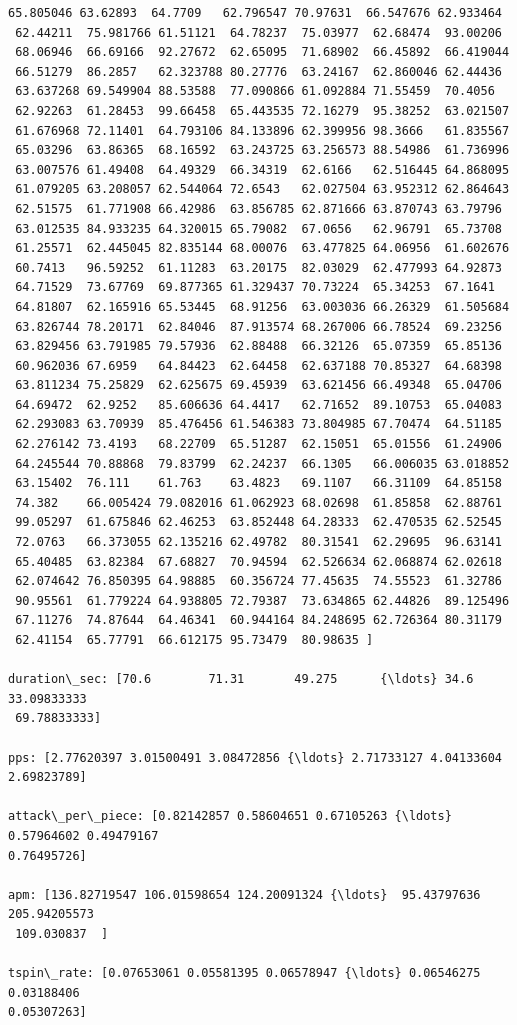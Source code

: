 \documentclass[11pt]{article}
\begin{document}
\begin{Verbatim}[commandchars=\\\{\}]
 65.805046 63.62893  64.7709   62.796547 70.97631  66.547676 62.933464
 62.44211  75.981766 61.51121  64.78237  75.03977  62.68474  93.00206
 68.06946  66.69166  92.27672  62.65095  71.68902  66.45892  66.419044
 66.51279  86.2857   62.323788 80.27776  63.24167  62.860046 62.44436
 63.637268 69.549904 88.53588  77.090866 61.092884 71.55459  70.4056
 62.92263  61.28453  99.66458  65.443535 72.16279  95.38252  63.021507
 61.676968 72.11401  64.793106 84.133896 62.399956 98.3666   61.835567
 65.03296  63.86365  68.16592  63.243725 63.256573 88.54986  61.736996
 63.007576 61.49408  64.49329  66.34319  62.6166   62.516445 64.868095
 61.079205 63.208057 62.544064 72.6543   62.027504 63.952312 62.864643
 62.51575  61.771908 66.42986  63.856785 62.871666 63.870743 63.79796
 63.012535 84.933235 64.320015 65.79082  67.0656   62.96791  65.73708
 61.25571  62.445045 82.835144 68.00076  63.477825 64.06956  61.602676
 60.7413   96.59252  61.11283  63.20175  82.03029  62.477993 64.92873
 64.71529  73.67769  69.877365 61.329437 70.73224  65.34253  67.1641
 64.81807  62.165916 65.53445  68.91256  63.003036 66.26329  61.505684
 63.826744 78.20171  62.84046  87.913574 68.267006 66.78524  69.23256
 63.829456 63.791985 79.57936  62.88488  66.32126  65.07359  65.85136
 60.962036 67.6959   64.84423  62.64458  62.637188 70.85327  64.68398
 63.811234 75.25829  62.625675 69.45939  63.621456 66.49348  65.04706
 64.69472  62.9252   85.606636 64.4417   62.71652  89.10753  65.04083
 62.293083 63.70939  85.476456 61.546383 73.804985 67.70474  64.51185
 62.276142 73.4193   68.22709  65.51287  62.15051  65.01556  61.24906
 64.245544 70.88868  79.83799  62.24237  66.1305   66.006035 63.018852
 63.15402  76.111    61.763    63.4823   69.1107   66.31109  64.85158
 74.382    66.005424 79.082016 61.062923 68.02698  61.85858  62.88761
 99.05297  61.675846 62.46253  63.852448 64.28333  62.470535 62.52545
 72.0763   66.373055 62.135216 62.49782  80.31541  62.29695  96.63141
 65.40485  63.82384  67.68827  70.94594  62.526634 62.068874 62.02618
 62.074642 76.850395 64.98885  60.356724 77.45635  74.55523  61.32786
 90.95561  61.779224 64.938805 72.79387  73.634865 62.44826  89.125496
 67.11276  74.87644  64.46341  60.944164 84.248695 62.726364 80.31179
 62.41154  65.77791  66.612175 95.73479  80.98635 ]

duration\_sec: [70.6        71.31       49.275      {\ldots} 34.6        33.09833333
 69.78833333]

pps: [2.77620397 3.01500491 3.08472856 {\ldots} 2.71733127 4.04133604 2.69823789]

attack\_per\_piece: [0.82142857 0.58604651 0.67105263 {\ldots} 0.57964602 0.49479167
0.76495726]

apm: [136.82719547 106.01598654 124.20091324 {\ldots}  95.43797636 205.94205573
 109.030837  ]

tspin\_rate: [0.07653061 0.05581395 0.06578947 {\ldots} 0.06546275 0.03188406
0.05307263]

    \end{Verbatim}
\end{document}

